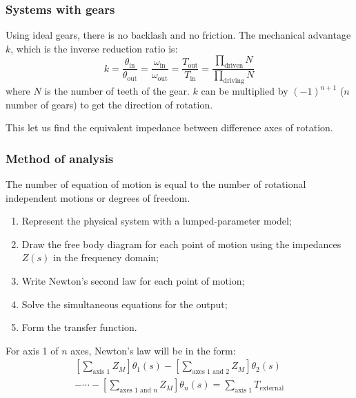 \documentclass[10pt, twocolumn]{article}
\begin{document}
\subsubsection{Systems with gears}
Using ideal gears, there is no backlash and no friction.
The mechanical advantage \(k\), which is the inverse reduction ratio is:
\[
  k = \frac{\theta_\mathrm{in}}{\theta_\mathrm{out}} = \frac{\omega_\mathrm{in}}{\omega_\mathrm{out}} = \frac{T_\mathrm{out}}{T_\mathrm{in}} = \frac{\prod_\mathrm{driven}{N}}{\prod_\mathrm{driving}{N}}
\]
where \(N\) is the number of teeth of the gear.
\(k\) can be multiplied by \((-1)^{n + 1}\) (\(n\) number of gears) to get the direction of rotation.

This let us find the equivalent impedance between difference axes of rotation.


\subsubsection{Method of analysis}
The number of equation of motion is equal to the number of rotational independent motions or degrees of freedom.

\begin{enumerate}
  \item Represent the physical system with a lumped-parameter model;
  \item Draw the free body diagram for each point of motion using the impedances \(Z(s)\) in the frequency domain;
  \item Write Newton's second law for each point of motion;
  \item Solve the simultaneous equations for the output;
  \item Form the transfer function.
\end{enumerate}

For axis 1 of \(n\) axes, Newton's law will be in the form:
\begin{multline*}
  \left[ \sum_\text{axis 1}{Z_M} \right] \theta_1(s) - \left[ \sum_\text{axes 1 and 2}{Z_M} \right] \theta_2(s)\\
  - \cdots - \left[ \sum_{\text{axes 1 and } n}{Z_M} \right] \theta_n(s) = \sum_\text{axis 1}{T_\text{external}}
\end{multline*}
\end{document}
